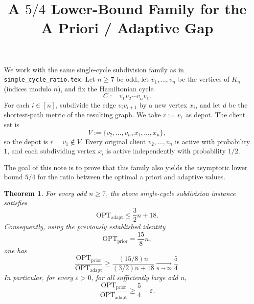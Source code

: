 \documentclass[11pt]{amsart}
\title{A $5/4$ Lower-Bound Family for the A Priori / Adaptive Gap}
\author{}
\date{}
\newtheorem{theorem}{Theorem}
\newcommand{\optprior}{\mathrm{OPT}_{\mathrm{prior}}}
\newcommand{\optadapt}{\mathrm{OPT}_{\mathrm{adapt}}}
\begin{document}
\maketitle

We work with the same single-cycle subdivision family as in \texttt{single\_cycle\_ratio.tex}. Let $n\ge 7$ be odd, let $v_1,\dots,v_n$ be the vertices of $K_n$ (indices modulo $n$), and fix the Hamiltonian cycle
\[
C:=v_1v_2\cdots v_nv_1.
\]
For each $i\in[n]$, subdivide the edge $v_iv_{i+1}$ by a new vertex $x_i$, and let $d$ be the shortest-path metric of the resulting graph. We take $r:=v_1$ as depot. The client set is
\[
V:=\{v_2,\dots,v_n,x_1,\dots,x_n\},
\]
so the depot is $r=v_1\notin V$. Every original client $v_2,\dots,v_n$ is active with probability $1$, and each subdividing vertex $x_i$ is active independently with probability $1/2$.

The goal of this note is to prove that this family also yields the asymptotic lower bound $5/4$ for the ratio between the optimal a priori and adaptive values.

\begin{theorem}\label{thm:main}
For every odd $n\ge 7$, the above single-cycle subdivision instance satisfies
\[
\optadapt\le \frac32 n+18.
\]
Consequently, using the previously established identity
\[
\optprior=\frac{15}{8}n,
\]
one has
\[
\frac{\optprior}{\optadapt}
\ge
\frac{(15/8)n}{(3/2)n+18}
\xrightarrow[n\to\infty]{}\frac54.
\]
In particular, for every $\varepsilon>0$, for all sufficiently large odd $n$,
\[
\frac{\optprior}{\optadapt}\ge \frac54-\varepsilon.
\]
\end{theorem}
\end{document}
